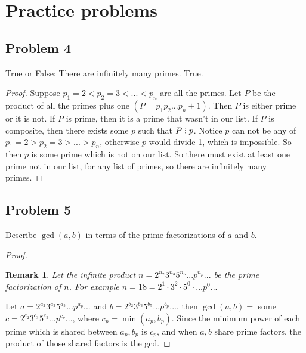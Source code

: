 \documentclass[12pt]{article}
\title{\scalebox{2}{Math 341 Homework 7}}
\author{\scalebox{1.5}{Theo Koss}}
\date{October 2020}
\newtheorem*{remark}{Remark}
\newcommand{\divby}{%
  \mathrel{\text{\vbox{\baselineskip.65ex\lineskiplimit0pt\hbox{.}\hbox{.}\hbox{.}}}}%
  }
\begin{document}
\maketitle
\section{Practice problems}
\subsection{Problem 4}
True or False: There are infinitely many primes.
\newline True.\begin{proof}
Suppose $p_1=2<p_2=3<...<p_n$ are all the primes. Let $P$ be the product of all the primes plus one $(P=p_1p_2...p_n+1)$. Then $P$ is either prime or it is not. If $P$ is prime, then it is a prime that wasn't in our list. If $P$ is composite, then there exists some $p$ such that $P\divby p$. Notice $p$ can not be any of $p_1=2>p_2=3>...>p_n$, otherwise $p$ would divide 1, which is impossible. So then $p$ is some prime which is not on our list. So there must exist at least one prime not in our list, for any list of primes, so there are infinitely many primes.
\end{proof}
\subsection{Problem 5}
Describe $\gcd(a,b)$ in terms of the prime factorizations of $a$ and $b$.
\begin{proof}
\begin{remark}Let the infinite product $n=2^{n_2}3^{n_3}5^{n_5}...p^{n_p}...$ be the prime factorization of $n$. For example $n=18=2^1\cdot3^2\cdot5^0\cdot...p^0...$ \end{remark}
\newline Let $a=2^{a_2}3^{a_3}5^{a_5}...p^{a_p}...$ and $b=2^{b_2}3^{b_3}5^{b_5}...p^{b_p}...$, then $\gcd(a,b)=$ some $c=2^{c_2}3^{c_3}5^{c_5}...p^{c_p}...$, where $c_p=\min(a_p,b_p)$. Since the minimum power of each prime which is shared between $a_p,b_p$ is $c_p$, and when $a,b$ share prime factors, the product of those shared factors is the gcd.
\end{proof}
\end{document}

